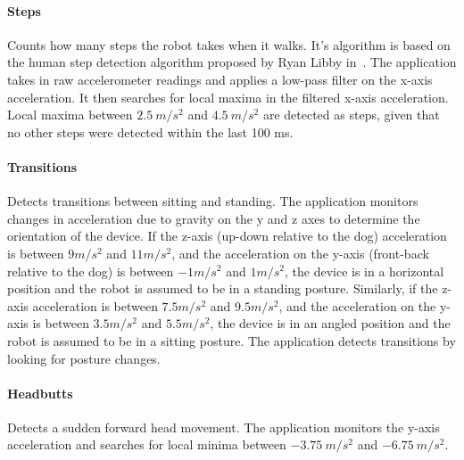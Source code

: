 \paragraph{Steps} Counts how many steps the robot takes when it
  walks. It's algorithm is based on the human step detection algorithm
  proposed by Ryan Libby in~\cite{libbyFootstepDetection}. The
  application takes in raw accelerometer readings and applies a
  low-pass filter on the x-axis acceleration. It then searches for
  local maxima in the filtered x-axis acceleration. Local maxima
  between $2.5\:m/s^2$ and $4.5\:m/s^2$ are detected as steps, given
  that no other steps were detected within the last 100 ms.

\paragraph{Transitions} Detects transitions between sitting and
  standing.  The application monitors changes in acceleration due to
  gravity on the y and z axes to determine the orientation of the
  device. If the z-axis (up-down relative to the dog) acceleration is
  between $9 m/s^2$ and $11 m/s^2$, and the acceleration on the y-axis
  (front-back relative to the dog) is between $-1 m/s^2$ and $1
  m/s^2$, the device is in a horizontal position and the robot is
  assumed to be in a standing posture. Similarly, if the z-axis
  acceleration is between $7.5 m/s^2$ and $9.5 m/s^2$, and the
  acceleration on the y-axis is between $3.5 m/s^2$ and $5.5 m/s^2$,
  the device is in an angled position and the robot is assumed to be
  in a sitting posture. The application detects transitions by looking
  for posture changes.

\paragraph{Headbutts} Detects a sudden forward head movement.  The
  application monitors the y-axis acceleration and searches for local
  minima between $-3.75\:m/s^2$ and $-6.75\:m/s^2$.
